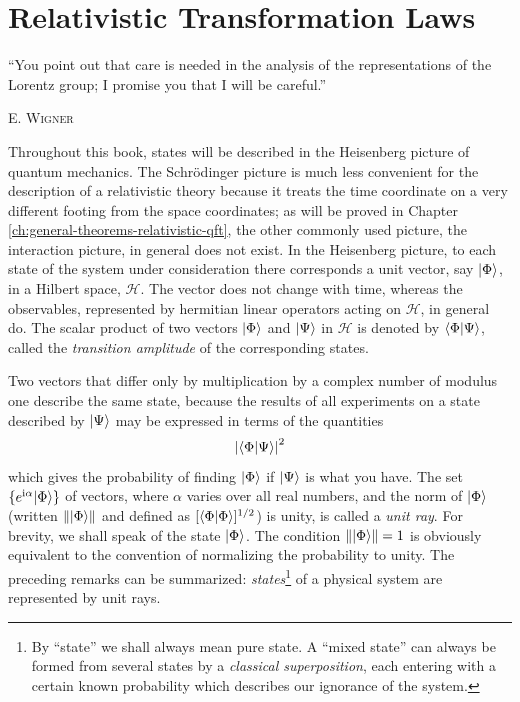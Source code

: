 \section{Relativistic Transformation Laws}\label{ch:relativistic-transformation-laws}

\begin{flushright}
\begin{minipage}{0.55\textwidth}
\small
``You point out that care is needed in the analysis of the representations
of the Lorentz group; I promise you that I will be careful.''

\medskip
\textsc{E. Wigner}
\end{minipage}
\end{flushright}

Throughout this book, states will be described in the Heisenberg picture of
quantum mechanics. The Schr\"odinger picture is much less convenient for the
description of a relativistic theory because it treats the time coordinate on
a very different footing from the space coordinates; as will be proved in
Chapter \ref{ch:general-theorems-relativistic-qft}, the other commonly used picture, the interaction picture, in
general does not exist. In the Heisenberg picture, to each state of the system
under consideration there corresponds a unit vector, say \(\lvert \Phi\rangle\), in a
Hilbert space, \(\mathcal H\). The vector does not change with time, whereas
the observables, represented by hermitian linear operators acting on
\(\mathcal H\), in general do. The scalar product of two vectors \(\lvert \Phi\rangle\)
and \(\lvert \Psi\rangle\) in \(\mathcal H\) is denoted by
\(\langle \Phi\vert \Psi\rangle\), called the \emph{transition amplitude} of the
corresponding states.

Two vectors that differ only by multiplication by a complex number of modulus
one describe the same state, because the results of all experiments on a state
described by \(\lvert \Psi\rangle\) may be expressed in terms of the quantities
\begin{equation*}
  \left|\langle \Phi\vert \Psi\rangle\right|^2
\end{equation*}
which gives the probability of finding \(\lvert \Phi\rangle\) if \(\lvert \Psi\rangle\) is
what you have. The set \(\{e^{\mathrm{i}\alpha}\lvert \Phi\rangle\}\) of vectors, where
\(\alpha\) varies over all real numbers, and the norm of \(\lvert \Phi\rangle\)
(written \(\lVert\lvert \Phi\rangle\rVert\)
and defined as \([\langle \Phi\vert \Phi\rangle]^{1/2}\)) is unity, is called a
\emph{unit ray}. For brevity, we shall speak of the state \(\lvert \Phi\rangle\). The
condition \(\lVert\lvert \Phi\rangle\rVert=1\) is obviously equivalent to the
convention of normalizing the probability to unity. The preceding remarks
can be summarized: \emph{states}\footnote{%
By ``state'' we shall always mean pure state. A ``mixed state'' can always be
formed from several states by a \emph{classical superposition}, each entering
with a certain known probability which describes our ignorance of the system.}
of a physical system are represented by unit rays.
